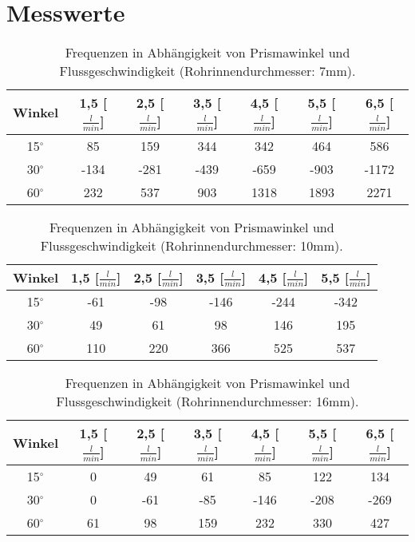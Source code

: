 \section{Messwerte}
\label{sec:Messwerte}

\begin{table}
    \centering
    \caption{Frequenzen in Abhängigkeit von Prismawinkel und Flussgeschwindigkeit (Rohrinnendurchmesser: 7mm).}
    \label{tab:Klein}

    \begin{tabular}{c | c c c c c c}
    \toprule
    Winkel & 1,5 [$\frac{l}{min}$] & 2,5 [$\frac{l}{min}$] & 3,5 [$\frac{l}{min}$] & 4,5 [$\frac{l}{min}$] & 5,5 [$\frac{l}{min}$] & 6,5 [$\frac{l}{min}$] \\
    \midrule
    15$^{\circ}$ & 85  & 159 & 344 & 342  & 464  & 586  \\
    30$^{\circ}$ &-134 &-281 &-439 &-659  &-903  &-1172 \\
    60$^{\circ}$ & 232 & 537 & 903 & 1318 & 1893 & 2271 \\ 
    \bottomrule

    \end{tabular}
\end{table}

\begin{table}
    \centering
    \caption{Frequenzen in Abhängigkeit von Prismawinkel und Flussgeschwindigkeit (Rohrinnendurchmesser: 10mm).}
    \label{tab:Mittel}

    \begin{tabular}{c | c c c c c}
    \toprule
    Winkel & 1,5 [$\frac{l}{min}$] & 2,5 [$\frac{l}{min}$] & 3,5 [$\frac{l}{min}$] & 4,5 [$\frac{l}{min}$] & 5,5 [$\frac{l}{min}$] \\
    \midrule
    15$^{\circ}$ &-61  &-98  &-146 &-244  &-342 \\
    30$^{\circ}$ & 49  & 61  & 98  & 146  & 195 \\
    60$^{\circ}$ & 110 & 220 & 366 & 525  & 537 \\ 
    \bottomrule

    \end{tabular}
\end{table}

\begin{table}
    \centering
    \caption{Frequenzen in Abhängigkeit von Prismawinkel und Flussgeschwindigkeit (Rohrinnendurchmesser: 16mm).}
    \label{tab:Groß}

    \begin{tabular}{c | c c c c c c}
    \toprule
    Winkel & 1,5 [$\frac{l}{min}$] & 2,5 [$\frac{l}{min}$] & 3,5 [$\frac{l}{min}$] & 4,5 [$\frac{l}{min}$] & 5,5 [$\frac{l}{min}$] & 6,5 [$\frac{l}{min}$] \\
    \midrule
    15$^{\circ}$ & 0  & 49 & 61  & 85  & 122 & 134 \\
    30$^{\circ}$ & 0  &-61 &-85  &-146 &-208 &-269 \\
    60$^{\circ}$ & 61 & 98 & 159 & 232 & 330 & 427 \\ 
    \bottomrule

    \end{tabular}
\end{table}


